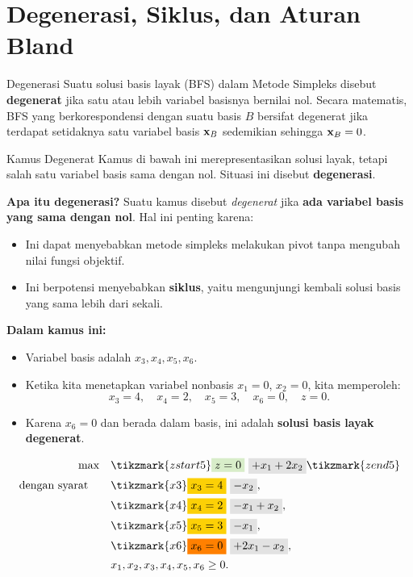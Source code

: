 \section{Degenerasi, Siklus, dan Aturan Bland}
\label{sec:degeneracy}

\begin{definition}{Degenerasi}{}
Suatu solusi basis layak (BFS) dalam Metode Simpleks disebut \textbf{degenerat} jika satu atau lebih variabel basisnya bernilai nol. Secara matematis, BFS yang berkorespondensi dengan suatu basis \( B \) bersifat degenerat jika terdapat setidaknya satu variabel basis \( \mathbf{x}_B \) sedemikian sehingga \( \mathbf{x}_B = 0 \).
\end{definition}

\begin{remark}{Kamus Degenerat}{}
Kamus di bawah ini merepresentasikan solusi layak, tetapi salah satu variabel basis sama dengan nol. Situasi ini disebut \textbf{degenerasi}.

\textbf{Apa itu degenerasi?}  
Suatu kamus disebut \emph{degenerat} jika \textbf{ada variabel basis yang sama dengan nol}. Hal ini penting karena:
\begin{itemize}
    \item Ini dapat menyebabkan metode simpleks melakukan pivot tanpa mengubah nilai fungsi objektif.
    \item Ini berpotensi menyebabkan \textbf{siklus}, yaitu mengunjungi kembali solusi basis yang sama lebih dari sekali.
\end{itemize}

\textbf{Dalam kamus ini:}
\begin{itemize}
    \item Variabel basis adalah \(x_3, x_4, x_5, x_6\).
    \item Ketika kita menetapkan variabel nonbasis \(x_1 = 0\), \(x_2 = 0\), kita memperoleh:
    \[
    x_3 = 4,\quad x_4 = 2,\quad x_5 = 3,\quad x_6 = \boxed{0},\quad z = 0.
    \]
    \item Karena \(x_6 = 0\) dan berada dalam basis, ini adalah \textbf{solusi basis layak degenerat}.
\end{itemize}

\vspace{1cm}

\[
\begin{aligned}
\max \quad 
& \tikzmark{zstart5} \text{\colorbox{green!20!white}{$z = 0$}} ~ \text{\colorbox{gray!20!white}{$+ x_1 + 2x_2$}} \tikzmark{zend5} \\
\st \quad 
& \tikzmark{x3} \text{\colorbox{yellow}{$x_3 = 4$}} ~ \text{\colorbox{gray!20!white}{$- x_2$}}, \\
& \tikzmark{x4} \text{\colorbox{yellow}{$x_4 = 2$}} ~ \text{\colorbox{gray!20!white}{$- x_1 + x_2$}}, \\
& \tikzmark{x5} \text{\colorbox{yellow}{$x_5 = 3$}} ~ \text{\colorbox{gray!20!white}{$- x_1$}}, \\
& \tikzmark{x6} \text{\colorbox{orange}{$x_6 = 0$}} ~ \text{\colorbox{gray!20!white}{$+ 2x_1 - x_2$}}, \\
& x_1, x_2, x_3, x_4, x_5, x_6 \geq 0.
\end{aligned}
\]


\end{remark}
